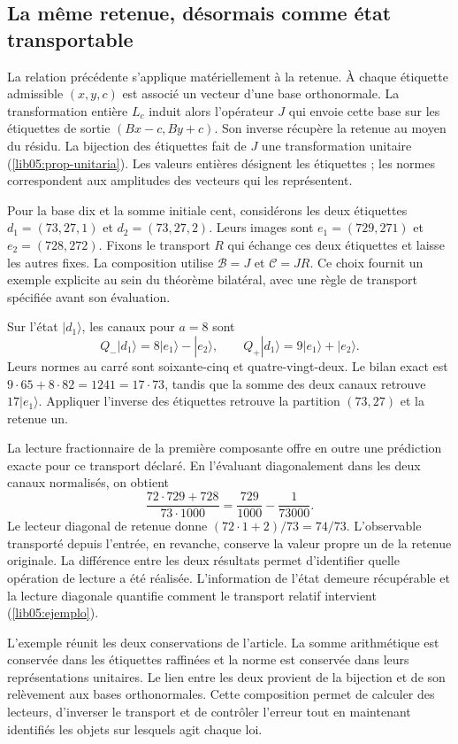 \subsection*{La même retenue, désormais comme état transportable}
\label{libnar:ejemplo}

La relation précédente s'applique matériellement à la retenue. À chaque étiquette admissible \((x,y,c)\) est associé un vecteur d'une base orthonormale. La transformation entière \(L_c\) induit alors l'opérateur \(J\) qui envoie cette base sur les étiquettes de sortie \((Bx-c,By+c)\). Son inverse récupère la retenue au moyen du résidu. La bijection des étiquettes fait de \(J\) une transformation unitaire (\cref{lib05:prop-unitaria}). Les valeurs entières désignent les étiquettes ; les normes correspondent aux amplitudes des vecteurs qui les représentent.

Pour la base dix et la somme initiale cent, considérons les deux étiquettes
\(d_1=(73,27,1)\) et \(d_2=(73,27,2)\). Leurs images sont
\(e_1=(729,271)\) et \(e_2=(728,272)\). Fixons le transport
\(R\) qui échange ces deux étiquettes et laisse les autres fixes.
La composition utilise \(\mathcal B=J\) et \(\mathcal C=JR\).
Ce choix fournit un exemple explicite au sein du théorème
bilatéral, avec une règle de transport spécifiée avant son évaluation.

Sur l’état \(|d_1\rangle\), les canaux pour \(a=8\)
sont
\[
 Q_-|d_1\rangle=8|e_1\rangle-|e_2\rangle,
 \qquad
 Q_+|d_1\rangle=9|e_1\rangle+|e_2\rangle.
\]
Leurs normes au carré sont soixante-cinq et quatre-vingt-deux. Le bilan
exact est \(9\cdot65+8\cdot82=1241=17\cdot73\), tandis que
la somme des deux canaux retrouve \(17|e_1\rangle\).
Appliquer l’inverse des étiquettes retrouve la partition \((73,27)\)
et la retenue un.

La lecture fractionnaire de la première composante offre en outre une
prédiction exacte pour ce transport déclaré. En l’évaluant
diagonalement dans les deux canaux normalisés, on obtient
\[
 \frac{72\cdot729+728}{73\cdot1000}
   =\frac{729}{1000}-\frac{1}{73000}.
\]
Le lecteur diagonal de retenue donne \((72\cdot1+2)/73=74/73\).
L’observable transporté depuis l’entrée, en revanche, conserve
la valeur propre un de la retenue originale. La différence entre les deux
résultats permet d’identifier quelle opération de lecture a été
réalisée. L’information de l’état demeure récupérable et la
lecture diagonale quantifie comment le transport relatif intervient
(\cref{lib05:ejemplo}).

L’exemple réunit les deux conservations de l’article. La somme
arithmétique est conservée dans les étiquettes raffinées et la norme est
conservée dans leurs représentations unitaires. Le lien entre les deux
provient de la bijection et de son relèvement aux bases orthonormales.
Cette composition permet de calculer des lecteurs, d’inverser le transport
et de contrôler l’erreur tout en maintenant identifiés les objets sur
lesquels agit chaque loi.

